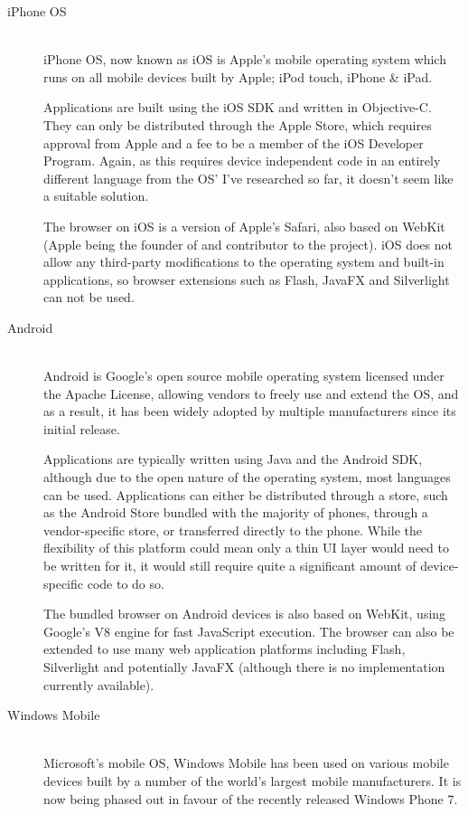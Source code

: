 \documentclass[a4papert,11pt,notitlepage]{ltxdoc}
\begin{document}
\begin{description}
\item[iPhone OS] \hfill \\
iPhone OS\cite{ios:web}, now known as iOS is Apple's mobile operating system which runs on all mobile devices built by Apple; iPod touch, iPhone \& iPad. 

Applications are built using the iOS SDK and written in Objective-C. They can only be distributed through the Apple Store, which requires approval from Apple and a fee to be a member of the iOS Developer Program. Again, as this requires device independent code in an entirely different language from the OS' I've researched so far, it doesn't seem like a suitable solution.

The browser on iOS is a version of Apple's Safari, also based on WebKit (Apple being the founder of and contributor to the project). iOS does not allow any third-party modifications to the operating system and built-in applications, so browser extensions such as Flash, JavaFX and Silverlight can not be used.

\item[Android] \hfill \\
Android\cite{android:web} is Google's open source mobile operating system licensed under the Apache License, allowing vendors to freely use and extend the OS, and as a result, it has been widely adopted by multiple manufacturers since its initial release.

Applications are typically written using Java and the Android SDK, although due to the open nature of the operating system, most languages can be used. Applications can either be distributed through a store, such as the Android Store bundled with the majority of phones, through a vendor-specific store, or transferred directly to the phone. While the flexibility of this platform could mean only a thin UI layer would need to be written for it, it would still require quite a significant amount of device-specific code to do so.

The bundled browser on Android devices is also based on WebKit, using Google's V8 engine for fast JavaScript execution. The browser can also be extended to use many web application platforms including Flash, Silverlight and potentially JavaFX (although there is no implementation currently available).

\item[Windows Mobile] \hfill \\
Microsoft's mobile OS, Windows Mobile\cite{winmo:web} has been used on various mobile devices built by a number of the world's largest mobile manufacturers. It is now being phased out in favour of the recently released Windows Phone 7.


\end{description}
\end{document}
